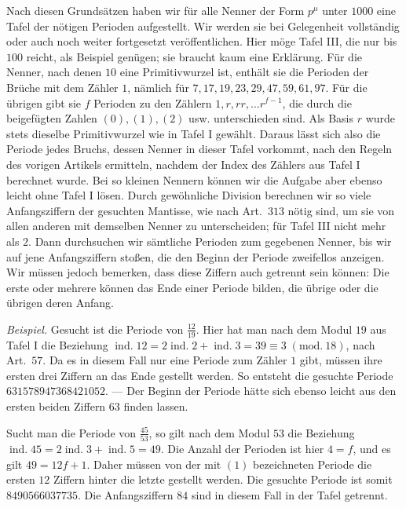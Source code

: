 Nach diesen Grundsätzen haben wir für alle Nenner der Form \(p^\mu\) unter \(1000\) eine Tafel der nötigen Perioden aufgestellt. Wir werden sie bei Gelegenheit vollständig oder auch noch weiter fortgesetzt veröffentlichen. Hier möge Tafel III, die nur bis \(100\) reicht, als Beispiel genügen; sie braucht kaum eine Erklärung. Für die Nenner, nach denen \(10\) eine Primitivwurzel ist, enthält sie die Perioden der Brüche mit dem Zähler \(1\), nämlich für \(7,17,19,23,29,47,59,61,97\). Für die übrigen gibt sie \(f\) Perioden zu den Zählern \(1,r,rr,\ldots r^{f-1}\), die durch die beigefügten Zahlen \((0),(1),(2)\) usw. unterschieden sind. Als Basis \(r\) wurde stets dieselbe Primitivwurzel wie in Tafel I gewählt. Daraus lässt sich also die Periode jedes Bruchs, dessen Nenner in dieser Tafel vorkommt, nach den Regeln des vorigen Artikels ermitteln, nachdem der Index des Zählers aus Tafel I berechnet wurde. Bei so kleinen Nennern können wir die Aufgabe aber ebenso leicht ohne Tafel I lösen. Durch gewöhnliche Division berechnen wir so viele Anfangsziffern der gesuchten Mantisse, wie nach Art.\ \(313\) nötig sind, um sie von allen anderen mit demselben Nenner zu unterscheiden; für Tafel III nicht mehr als \(2\). Dann durchsuchen wir sämtliche Perioden zum gegebenen Nenner, bis wir auf jene Anfangsziffern stoßen, die den Beginn der Periode zweifellos anzeigen. Wir müssen jedoch bemerken, dass diese Ziffern auch getrennt sein können: Die erste oder mehrere können das Ende einer Periode bilden, die übrige oder die übrigen deren Anfang.

\textit{Beispiel.} Gesucht ist die Periode von \(\frac{12}{19}\). Hier hat man nach dem Modul \(19\) aus Tafel I
die Beziehung \(\operatorname{ind.}12=2\operatorname{ind.}2+\operatorname{ind.}3=39\equiv3\; (\mathrm{mod}.\ 18)\), nach Art.\ \(57\). Da es in diesem Fall nur eine Periode zum Zähler \(1\) gibt, müssen ihre ersten drei Ziffern an das Ende gestellt werden. So entsteht die gesuchte Periode \(631578947368421052\). — Der Beginn der Periode hätte sich ebenso leicht aus den ersten beiden Ziffern \(63\) finden lassen.

Sucht man die Periode von \(\frac{45}{53}\), so gilt nach dem Modul \(53\) die Beziehung \(\operatorname{ind.}45=2\operatorname{ind.}3 +\operatorname{ind.}5=49\). Die Anzahl der Perioden ist hier \(4=f\), und es gilt \(49=12f+1\). Daher müssen von der mit \((1)\) bezeichneten Periode die ersten \(12\) Ziffern hinter die letzte gestellt werden. Die gesuchte Periode ist somit \(8490566037735\). Die Anfangsziffern \(84\) sind in diesem Fall in der Tafel getrennt.

